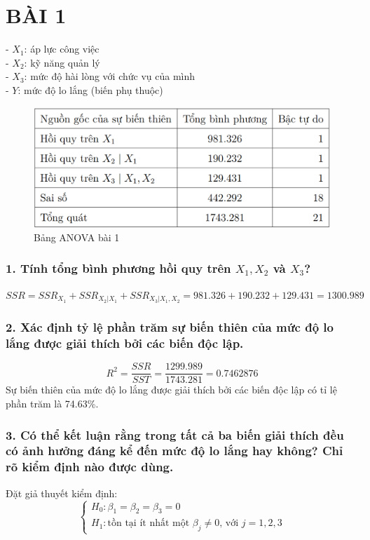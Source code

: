 \documentclass[a4paper]{article}
\theoremstyle{nonumberplain}
\begin{document}
\section*{BÀI 1}
- $X_1$: áp lực công việc\\
- $X_2$: kỹ năng quản lý\\
- $X_3$: mức độ hài lòng với chức vụ của mình\\
- $Y$: mức độ lo lắng (biến phụ thuộc)
\begin{figure}[h!]
	\centering
	\includegraphics[scale =0.5]{anova1.PNG}  
	\caption{Bảng ANOVA bài 1}
	\label{ex1:model:1}
\end{figure}
\subsubsection*{1. Tính tổng bình phương hồi quy trên $X_1, X_2$ và $X_3$?}
$SSR = SSR_{X_1} + SSR_{X_2|X_1} + SSR_{X_3|X_1,X_2} = 981.326 + 190.232 + 129.431 = 1300.989$
\subsubsection*{2. Xác định tỷ lệ phần trăm sự biến thiên của mức độ lo lắng được giải thích bởi các biến độc lập.}

\[R^2 = \dfrac{SSR}{SST} = \dfrac{1299.989}{1743.281} = 0.7462876\]
Sự biến thiên của mức độ lo lắng được giải thích bởi các biến độc lập có tỉ lệ phần trăm là 74.63\%.

\subsubsection*{3. Có thể kết luận rằng trong tất cả ba biến giải thích đều có ảnh hưởng đáng kể đến mức độ lo lắng hay không? Chỉ rõ kiểm định nào được dùng.}

Đặt giả thuyết kiểm định:
\[\begin{cases}
	H_0: \beta_1 = \beta_2 = \beta_3 = 0\\
	H_1: \text{tồn tại ít nhất một } \beta_j \neq 0 \text{, với } j=1,2,3 
\end{cases}\]
\end{document}
